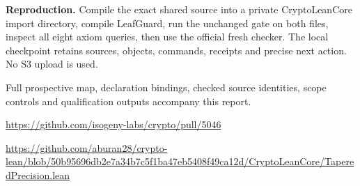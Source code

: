 \documentclass[10pt]{article}
\begin{document}
\textbf{Reproduction.} Compile the exact shared source into a private
CryptoLeanCore import directory, compile LeafGuard, run the unchanged gate on
both files, inspect all eight axiom queries, then use the official fresh
checker. The local checkpoint retains sources, objects, commands, receipts
and precise next action. No S3 upload is used.

\small Full prospective map, declaration bindings, checked source identities,
scope controls and qualification outputs accompany this report.\par
\url{https://github.com/isogeny-labs/crypto/pull/5046}\par
\url{https://github.com/aburan28/crypto-lean/blob/50b95696db2e7a34b7c5f1ba47eb5408f49ca12d/CryptoLeanCore/TaperedPrecision.lean}
\end{document}
